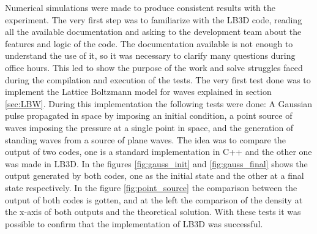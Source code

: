 Numerical simulations were made to produce consistent results with the experiment. The very first step was to familiarize with the LB3D code, reading all the available documentation and asking to the development team about the features and logic of the code. The documentation available is not enough to understand the use of it, so it was necessary to clarify many questions during office hours. This led to show the purpose of the work and solve struggles faced during the compilation and execution of the tests. The very first test done was to implement the Lattice Boltzmann model for waves explained in section \ref{sec:LBW}. During this implementation the following tests were done: A Gaussian pulse propagated in space by imposing an initial condition, a point source of waves imposing the pressure at a single point in space, and the generation of standing waves from a source of plane waves. The idea was to compare the output of two codes, one is a standard implementation in C++ and the other one was made in LB3D. In the figures \ref{fig:gauss_init} and \ref{fig:gauss_final} shows the output generated by both codes, one as the initial state and the other at a final state respectively. In the figure \ref{fig:point_source} the comparison between the output of both codes is gotten, and at the left the comparison of the density at the x-axis of both outputs and the theoretical solution. With these tests it was possible to confirm that the implementation of LB3D was successful. 

